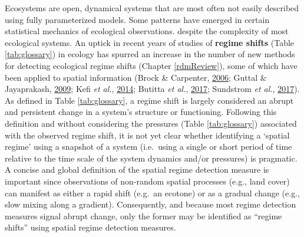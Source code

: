 \documentclass[print]{nuthesis}
\begin{document}
Ecosystems are open, dynamical systems that are most often not easily described using fully parameterized models. Some patterns have emerged in certain statistical mechanics of ecological observations. despite the complexity of most ecological systems. An uptick in recent years of studies of \textbf{regime shifts} (Table \ref{tab:glossary}) in ecology has spurred an increase in the number of new methods for detecting ecological regime shifts (Chapter \ref{rdmReview}), some of which have been applied to spatial information (Brock \& Carpenter, \protect\hyperlink{ref-brock_variance_2006}{2006}; Guttal \& Jayaprakash, \protect\hyperlink{ref-guttal2009spatial}{2009}; Kefi \emph{et al.}, \protect\hyperlink{ref-kefi2014early}{2014}; Butitta \emph{et al.}, \protect\hyperlink{ref-butitta_spatial_2017}{2017}; Sundstrom \emph{et al.}, \protect\hyperlink{ref-sundstrom2017detecting}{2017}). As defined in Table \ref{tab:glossary}, a regime shift is largely considered an abrupt and persistent change in a system's structure or functioning. Following this definition and without considering the pressures (Table \ref{tab:glossary}) associated with the observed regime shift, it is not yet clear whether identifying a `spatial regime' using a snapshot of a system (i.e.~using a single or short period of time relative to the time scale of the system dynamics and/or pressures) is pragmatic. A concise and global definition of the spatial regime detection measure is important since observations of non-random spatial processes (e.g., land cover) can manifest as either a rapid shift (e.g.~an ecotone) or as a gradual change (e.g., slow mixing along a gradient). Consequently, and because most regime detection measures signal abrupt change, only the former may be identified as ``regime shifts'' using spatial regime detection measures.
\end{document}
